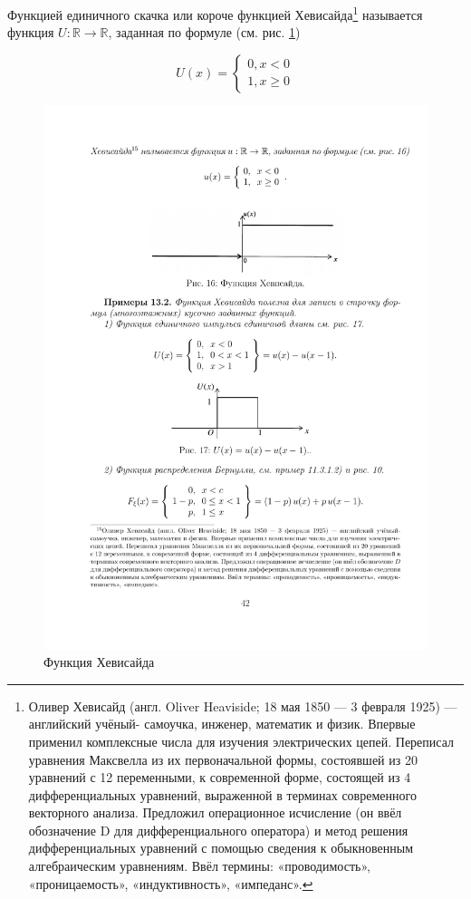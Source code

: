 \begin{theorem}
	Функцией единичного скачка или короче функцией
Хевисайда\footnote{Оливер Хевисайд (англ. Oliver Heaviside; 18 мая 1850 — 3 февраля 1925) — английский учёный-
самоучка, инженер, математик и физик. Впервые применил комплексные числа для изучения электрических цепей. Переписал уравнения Максвелла из их первоначальной формы, состоявшей из 20 уравнений
с 12 переменными, к современной форме, состоящей из 4 дифференциальных уравнений, выраженной в
терминах современного векторного анализа. Предложил операционное исчисление (он ввёл обозначение D
для дифференциального оператора) и метод решения дифференциальных уравнений с помощью сведения
к обыкновенным алгебраическим уравнениям. Ввёл термины: «проводимость», «проницаемость», «индуктивность», «импеданс».} называется функция $U : \mathbb{R}\rightarrow \mathbb{R}$, заданная по формуле (см. рис. \ref{fig16})

\begin{equation*}
U(x) = 
 \begin{cases}
   0,x<0\\
   1,x\geqslant 0 
 \end{cases}
\end{equation*}
\end{theorem}
\begin{figure}[h!]
	\centering
	\includegraphics[]{pic/pic16}
	\caption{Функция Хевисайда}
	\label{fig16}
\end{figure}

